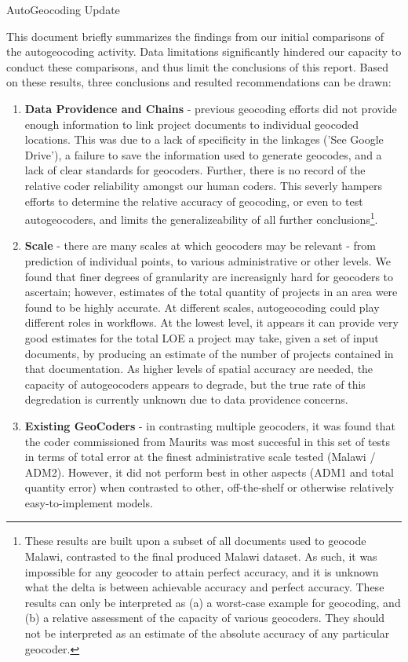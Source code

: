 \documentclass[10pt]{article}
\begin{document}
{\LARGE AutoGeocoding Update}


This document briefly summarizes the findings from our initial comparisons of the autogeocoding activity.  Data limitations significantly hindered our capacity to conduct these comparisons, and thus limit the conclusions of this report.  Based on these results, three conclusions and resulted recommendations can be drawn:

\begin{enumerate}
\item \textbf{Data Providence and Chains} - previous geocoding efforts did not provide enough information to link project documents to individual geocoded locations. This was due to a lack of specificity in the linkages ('See Google Drive'), a failure to save the information used to generate geocodes, and a lack of clear standards for geocoders.  Further, there is no record of the relative coder reliability amongst our human coders. This severly hampers efforts to determine the relative accuracy of geocoding, or even to test autogeocoders, and limits the generalizeability of all further conclusions\footnote{These results are built upon a subset of all documents used to geocode Malawi, contrasted to the final produced Malawi dataset.  As such, it was impossible for any geocoder to attain perfect accuracy, and it is unknown what the delta is between achievable accuracy and perfect accuracy.  These results can only be interpreted as (a) a worst-case example for geocoding, and (b) a relative assessment of the capacity of various geocoders.  They should not be interpreted as an estimate of the absolute accuracy of any particular geocoder.}.
\item \textbf{Scale} - there are many scales at which geocoders may be relevant - from prediction of individual points, to various administrative or other levels.  We found that finer degrees of granularity are increasignly hard for geocoders to ascertain; however, estimates of the total quantity of projects in an area were found to be highly accurate. At different scales, autogeocoding could play different roles in workflows.  At the lowest level, it appears it can provide very good estimates for the total LOE a project may take, given a set of input documents, by producing an estimate of the number of projects contained in that documentation.  As higher levels of spatial accuracy are needed, the capacity of autogeocoders appears to degrade, but the true rate of this degredation is currently unknown due to data providence concerns. 
\item \textbf{Existing GeoCoders} - in contrasting multiple geocoders, it was found that the coder commissioned from Maurits was most succesful in this set of tests in terms of total error at the finest administrative scale tested (Malawi / ADM2).  However, it did not perform best in other aspects (ADM1 and total quantity error) when contrasted to other, off-the-shelf or otherwise relatively easy-to-implement models. 
\end{enumerate}
\end{document}
